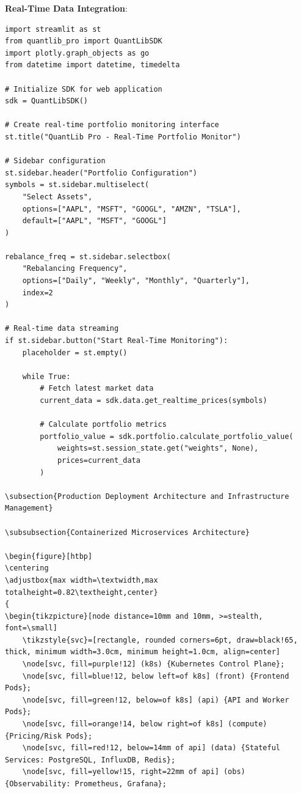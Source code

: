 \documentclass[12pt,a4paper]{article}
\theoremstyle{definition}
\theoremstyle{remark}
\begin{document}
\textbf{Real-Time Data Integration}:
\begin{lstlisting}[caption=Web Application Data Streaming]
import streamlit as st
from quantlib_pro import QuantLibSDK
import plotly.graph_objects as go
from datetime import datetime, timedelta

# Initialize SDK for web application
sdk = QuantLibSDK()

# Create real-time portfolio monitoring interface
st.title("QuantLib Pro - Real-Time Portfolio Monitor")

# Sidebar configuration
st.sidebar.header("Portfolio Configuration")
symbols = st.sidebar.multiselect(
    "Select Assets",
    options=["AAPL", "MSFT", "GOOGL", "AMZN", "TSLA"],
    default=["AAPL", "MSFT", "GOOGL"]
)

rebalance_freq = st.sidebar.selectbox(
    "Rebalancing Frequency",
    options=["Daily", "Weekly", "Monthly", "Quarterly"],
    index=2
)

# Real-time data streaming
if st.sidebar.button("Start Real-Time Monitoring"):
    placeholder = st.empty()
    
    while True:
        # Fetch latest market data
        current_data = sdk.data.get_realtime_prices(symbols)
        
        # Calculate portfolio metrics
        portfolio_value = sdk.portfolio.calculate_portfolio_value(
            weights=st.session_state.get("weights", None),
            prices=current_data
        )
        
\subsection{Production Deployment Architecture and Infrastructure Management}

\subsubsection{Containerized Microservices Architecture}

\begin{figure}[htbp]
\centering
\adjustbox{max width=\textwidth,max totalheight=0.82\textheight,center}
{
\begin{tikzpicture}[node distance=10mm and 10mm, >=stealth, font=\small]
    \tikzstyle{svc}=[rectangle, rounded corners=6pt, draw=black!65, thick, minimum width=3.0cm, minimum height=1.0cm, align=center]
    \node[svc, fill=purple!12] (k8s) {Kubernetes Control Plane};
    \node[svc, fill=blue!12, below left=of k8s] (front) {Frontend Pods};
    \node[svc, fill=green!12, below=of k8s] (api) {API and Worker Pods};
    \node[svc, fill=orange!14, below right=of k8s] (compute) {Pricing/Risk Pods};
    \node[svc, fill=red!12, below=14mm of api] (data) {Stateful Services: PostgreSQL, InfluxDB, Redis};
    \node[svc, fill=yellow!15, right=22mm of api] (obs) {Observability: Prometheus, Grafana};


\end{lstlisting}
\end{document}
